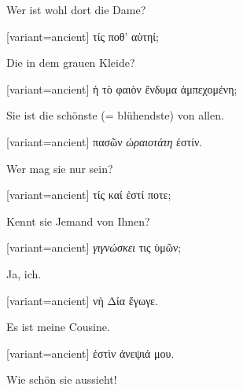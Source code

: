 Wer ist wohl dort die Dame? 

\switchcolumn

\begin{greek}[variant=ancient]%
τίς ποθ' αὑτηί;

\end{greek}%
\switchcolumn*

Die in dem grauen Kleide? 

\switchcolumn

\begin{greek}[variant=ancient]%
ἡ τὸ φαιὸν ἔνδυμα ἀμπεχομένη;

\end{greek}%
\switchcolumn*

Sie ist die schönste (= blühendste) von allen. 

\switchcolumn

\begin{greek}[variant=ancient]%
πασῶν \emph{ὡραιοτάτη} ἐστίν.

\end{greek}%
\switchcolumn*

Wer mag sie nur sein? 

\switchcolumn

\begin{greek}[variant=ancient]%
τίς καί ἐστί ποτε;

\end{greek}%
\switchcolumn*

Kennt sie Jemand von Ihnen? 

\switchcolumn

\begin{greek}[variant=ancient]%
\emph{γιγνώσκει} τις ὑμῶν;

\end{greek}%
\switchcolumn*

Ja, ich. 

\switchcolumn

\begin{greek}[variant=ancient]%
νὴ Δία ἔγωγε.

\end{greek}%
\switchcolumn*

Es ist meine Cousine. 

\switchcolumn

\begin{greek}[variant=ancient]%
ἐστὶν ἀνεψιά μου.

\end{greek}%
\switchcolumn*

Wie schön sie aus\textcompwordmark{}sieht! 

